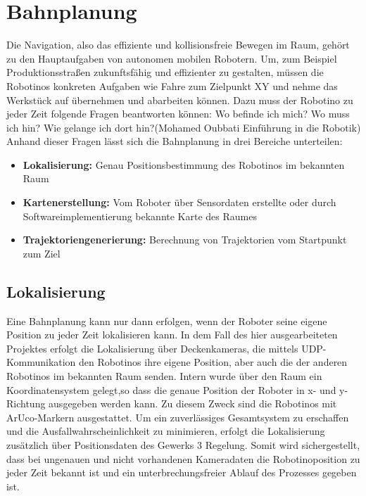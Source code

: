 \DeclareInputText
\newpage
\chapter{Bahnplanung}
Die Navigation, also das effiziente und kollisionsfreie Bewegen im Raum, gehört zu den Hauptaufgaben von autonomen mobilen Robotern. Um, zum Beispiel Produktionsstraßen zukunftsfähig und effizienter zu gestalten, müssen die Robotinos konkreten Aufgaben wie \glqq Fahre zum Zielpunkt XY und nehme das Werkstück auf\grqq{} übernehmen und abarbeiten können. Dazu muss der Robotino zu jeder Zeit folgende Fragen beantworten können: \glqq Wo befinde ich mich? Wo muss ich hin? Wie gelange ich dort hin?\grqq (Mohamed Oubbati Einführung in die Robotik)
Anhand dieser Fragen lässt sich die Bahnplanung in drei Bereiche unterteilen:
\begin{itemize}
\item \textbf{Lokalisierung:} Genau Positionsbestimmung des Robotinos im bekannten Raum
\item \textbf{Kartenerstellung:} Vom Roboter über Sensordaten erstellte oder durch Softwareimplementierung bekannte Karte des Raumes
\item \textbf{Trajektoriengenerierung:} Berechnung von Trajektorien vom Startpunkt zum Ziel
\end{itemize}
\section{Lokalisierung}
Eine Bahnplanung kann nur dann erfolgen, wenn der Roboter seine eigene Position zu jeder Zeit lokalisieren kann. 
In dem Fall des hier ausgearbeiteten Projektes erfolgt die Lokalisierung über Deckenkameras, die mittels UDP-Kommunikation den Robotinos ihre eigene Position, aber auch die der anderen Robotinos im bekannten Raum senden. Intern wurde über den Raum ein Koordinatensystem gelegt,so dass die genaue Position der Roboter in x- und y-Richtung ausgegeben werden kann. Zu diesem Zweck sind die Robotinos mit ArUco-Markern ausgestattet. Um ein zuverlässiges Gesamtsystem zu erschaffen und die Ausfallwahrscheinlichkeit zu minimieren, erfolgt die Lokalisierung zusätzlich über Positionsdaten des Gewerks 3 \glqq Regelung\grqq. Somit wird sichergestellt, dass bei ungenauen und nicht vorhandenen Kameradaten die Robotinoposition zu jeder Zeit bekannt ist und ein unterbrechungsfreier Ablauf des Prozesses gegeben ist. 
